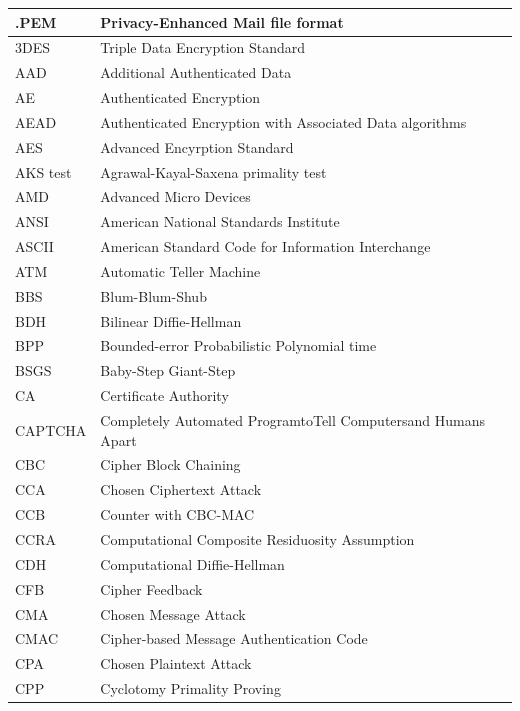 \documentclass[a4paper, 12pt]{book} %
\begin{document}
\begin{longtable}{||lp{11cm}||} \hline 
    .PEM & Privacy-Enhanced Mail file format \\ \hline 
    3DES & Triple Data Encryption Standard \\ \hline 
    AAD & Additional Authenticated Data \\ \hline 
    AE & Authenticated Encryption \\ \hline 
    AEAD & Authenticated Encryption with Associated \newline Data algorithms \\ \hline 
    AES & Advanced Encyrption Standard \\ \hline 
    AKS test & Agrawal-Kayal-Saxena primality test \\ \hline 
    AMD & Advanced Micro Devices \\ \hline 
    ANSI & American National Standards Institute \\ \hline 
    ASCII & American Standard Code for Information Interchange \\ \hline  
    ATM & Automatic Teller Machine \\ \hline 
    BBS & Blum-Blum-Shub \\ \hline 
    BDH & Bilinear Diffie-Hellman \\ \hline 
    BPP & Bounded-error Probabilistic Polynomial time \\ \hline 
    BSGS & Baby-Step Giant-Step \\ \hline 
    CA & Certificate Authority \\ \hline 
    CAPTCHA & Completely Automated ProgramtoTell Computersand Humans Apart \\ \hline 
    CBC & Cipher Block Chaining \\ \hline 
    CCA & Chosen Ciphertext Attack \\ \hline 
    CCB & Counter with CBC-MAC \\ \hline 
    CCRA & Computational Composite Residuosity Assumption \\ \hline 
    CDH & Computational Diffie-Hellman \\ \hline 
    CFB & Cipher Feedback \\ \hline 
    CMA & Chosen Message Attack \\ \hline 
    CMAC & Cipher-based Message Authentication Code \\ \hline 
    CPA & Chosen Plaintext Attack \\ \hline 
    CPP & Cyclotomy Primality Proving \\ \hline 

\end{longtable}
\end{document}
